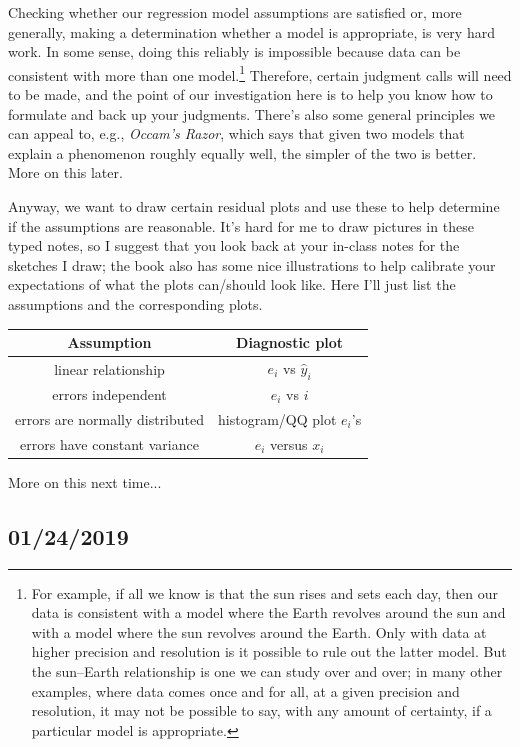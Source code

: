 \documentclass[a4paper, 12pt]{article}
\theoremstyle{plain}
\theoremstyle{definition}
\theoremstyle{remark}
\begin{document}
Checking whether our regression model assumptions are satisfied or, more generally, making a determination whether a model is appropriate, is very hard work.  In some sense, doing this reliably is impossible because data can be consistent with more than one model.\footnote{For example, if all we know is that the sun rises and sets each day, then our data is consistent with a model where the Earth revolves around the sun and with a model where the sun revolves around the Earth.  Only with data at higher precision and resolution is it possible to rule out the latter model.  But the sun--Earth relationship is one we can study over and over; in many other examples, where data comes once and for all, at a given precision and resolution, it may not be possible to say, with any amount of certainty, if a particular model is appropriate.}  Therefore, certain judgment calls will need to be made, and the point of our investigation here is to help you know how to formulate and back up your judgments.  There's also some general principles we can appeal to, e.g., {\em Occam's Razor}, which says that given two models that explain a phenomenon roughly equally well, the simpler of the two is better.  More on this later.  

Anyway, we want to draw certain residual plots and use these to help determine if the assumptions are reasonable.  It's hard for me to draw pictures in these typed notes, so I suggest that you look back at your in-class notes for the sketches I draw; the book also has some nice illustrations to help calibrate your expectations of what the plots can/should look like.  Here I'll just list the assumptions and the corresponding plots.  
{%
\begin{center}
\begin{tabular}{cc}
\hline 
Assumption & Diagnostic plot \\
\hline
linear relationship & $e_i$ vs $\hat y_i$ \\
errors independent & $e_i$ vs $i$ \\
errors are normally distributed & histogram/QQ plot $e_i$'s \\
errors have constant variance & $e_i$ versus $x_i$ \\
\hline
\end{tabular}
\end{center}
}
\noindent More on this next time...


\subsection*{01/24/2019}
\end{document}
